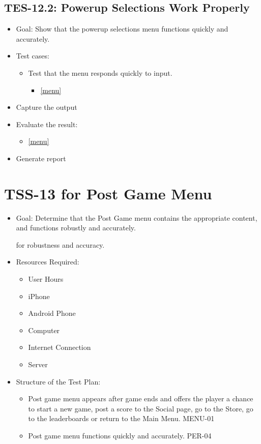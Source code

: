 \subsection{TES-12.2: Powerup Selections Work Properly }
\begin{itemize}
\item Goal: Show that the powerup selections menu functions quickly and accurately. 
\item Test cases: 

\begin{itemize}
\item Test that the menu responds quickly to input.
\begin{itemize}
\item \ref{menu}
\end{itemize}
\end{itemize}
\item Capture the output 
\item Evaluate the result: 

\begin{itemize}
\item \ref{menu}
\end{itemize}
\item Generate report 
\end{itemize}




\section{TSS-13 for Post Game Menu}
\begin{itemize}
\item Goal: Determine that the Post Game menu contains the appropriate content, and functions robustly and accurately.

for robustness and accuracy.

\item Resources Required:
\begin{itemize}
\item User Hours 
\item iPhone 
\item Android Phone 
\item Computer 
\item Internet Connection 
\item Server
\end{itemize}
\item Structure of the Test Plan: 

\begin{itemize}

\item Post game menu appears after game ends and offers the player a chance to start a new game, post a score to the Social page, 
go to the Store, go to the leaderboards or return to the Main Menu. MENU-01

\item Post game menu functions quickly and accurately. PER-04
\end{itemize}
\end{itemize}

